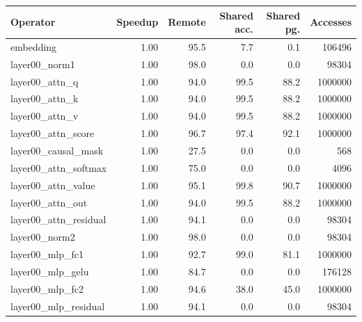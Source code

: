 \begin{tabular}{lrrrrr}
\toprule
Operator & Speedup & Remote & Shared acc. & Shared pg. & Accesses \\
\midrule
embedding & 1.00 & 95.5 & 7.7 & 0.1 & 106496 \\
layer00\_norm1 & 1.00 & 98.0 & 0.0 & 0.0 & 98304 \\
layer00\_attn\_q & 1.00 & 94.0 & 99.5 & 88.2 & 1000000 \\
layer00\_attn\_k & 1.00 & 94.0 & 99.5 & 88.2 & 1000000 \\
layer00\_attn\_v & 1.00 & 94.0 & 99.5 & 88.2 & 1000000 \\
layer00\_attn\_score & 1.00 & 96.7 & 97.4 & 92.1 & 1000000 \\
layer00\_causal\_mask & 1.00 & 27.5 & 0.0 & 0.0 & 568 \\
layer00\_attn\_softmax & 1.00 & 75.0 & 0.0 & 0.0 & 4096 \\
layer00\_attn\_value & 1.00 & 95.1 & 99.8 & 90.7 & 1000000 \\
layer00\_attn\_out & 1.00 & 94.0 & 99.5 & 88.2 & 1000000 \\
layer00\_attn\_residual & 1.00 & 94.1 & 0.0 & 0.0 & 98304 \\
layer00\_norm2 & 1.00 & 98.0 & 0.0 & 0.0 & 98304 \\
layer00\_mlp\_fc1 & 1.00 & 92.7 & 99.0 & 81.1 & 1000000 \\
layer00\_mlp\_gelu & 1.00 & 84.7 & 0.0 & 0.0 & 176128 \\
layer00\_mlp\_fc2 & 1.00 & 94.6 & 38.0 & 45.0 & 1000000 \\
layer00\_mlp\_residual & 1.00 & 94.1 & 0.0 & 0.0 & 98304 \\
\bottomrule
\end{tabular}
